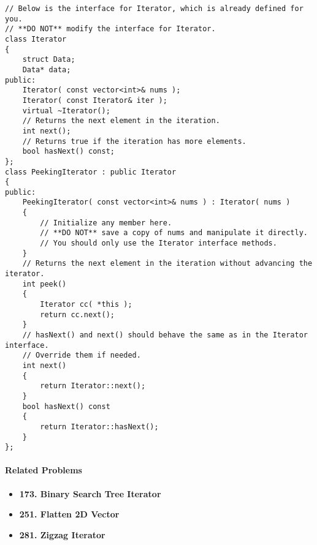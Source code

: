 \begin{lstlisting}[style=customc, caption={Copy Constructor}]
// Below is the interface for Iterator, which is already defined for you.
// **DO NOT** modify the interface for Iterator.
class Iterator
{
    struct Data;
    Data* data;
public:
    Iterator( const vector<int>& nums );
    Iterator( const Iterator& iter );
    virtual ~Iterator();
    // Returns the next element in the iteration.
    int next();
    // Returns true if the iteration has more elements.
    bool hasNext() const;
};
class PeekingIterator : public Iterator
{
public:
    PeekingIterator( const vector<int>& nums ) : Iterator( nums )
    {
        // Initialize any member here.
        // **DO NOT** save a copy of nums and manipulate it directly.
        // You should only use the Iterator interface methods.
    }
    // Returns the next element in the iteration without advancing the iterator.
    int peek()
    {
        Iterator cc( *this );
        return cc.next();
    }
    // hasNext() and next() should behave the same as in the Iterator interface.
    // Override them if needed.
    int next()
    {
        return Iterator::next();
    }
    bool hasNext() const
    {
        return Iterator::hasNext();
    }
};
\end{lstlisting}

\paragraph{Related Problems}
\begin{itemize}
\item \textbf{173. Binary Search Tree Iterator}
\item \textbf{251. Flatten 2D Vector}
\item \textbf{281. Zigzag Iterator}
\end{itemize}
